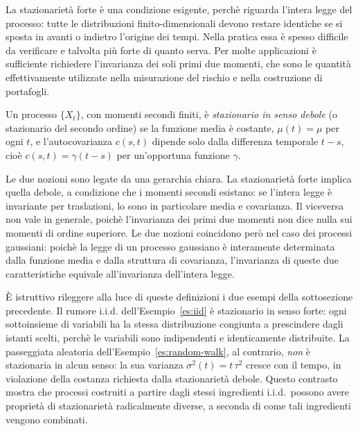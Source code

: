 La stazionariet\`{a} forte \`{e} una condizione esigente, perch\`{e}
riguarda l'intera legge del processo: tutte le distribuzioni
finito-dimensionali devono restare identiche se si sposta in avanti
o indietro l'origine dei tempi. Nella pratica essa \`{e} spesso
difficile da verificare e talvolta pi\`{u} forte di quanto serva. Per
molte applicazioni \`{e} sufficiente richiedere l'invarianza dei soli
primi due momenti, che sono le quantit\`{a} effettivamente utilizzate
nella misurazione del rischio e nella costruzione di portafogli.

\begin{definition}
\label{def:stazionario-debole}
Un processo $\{X_t\}$, con momenti secondi finiti, \`{e}
\emph{stazionario in senso debole} (o stazionario del secondo ordine)
se la funzione media \`{e} costante, $\mu(t)=\mu$ per ogni $t$, e
l'autocovarianza $c(s,t)$ dipende solo dalla differenza temporale
$t-s$, cio\`{e} $c(s,t)=\gamma(t-s)$ per un'opportuna funzione
$\gamma$.
\end{definition}

Le due nozioni sono legate da una gerarchia chiara. La stazionariet\`{a}
forte implica quella debole, a condizione che i momenti secondi
esistano: se l'intera legge \`{e} invariante per traslazioni, lo sono
in particolare media e covarianza. Il viceversa non vale in generale,
poich\`{e} l'invarianza dei primi due momenti non dice nulla sui
momenti di ordine superiore. Le due nozioni coincidono per\`{o} nel
caso dei processi gaussiani: poich\`{e} la legge di un processo
gaussiano \`{e} interamente determinata dalla funzione media e dalla
struttura di covarianza, l'invarianza di queste due caratteristiche
equivale all'invarianza dell'intera legge.

\`{E} istruttivo rileggere alla luce di queste definizioni i due
esempi della sottosezione precedente. Il rumore i.i.d.
dell'Esempio~\ref{es:iid} \`{e} stazionario in senso forte: ogni
sottoinsieme di variabili ha la stessa distribuzione congiunta a
prescindere dagli istanti scelti, perch\`{e} le variabili sono
indipendenti e identicamente distribuite. La passeggiata aleatoria
dell'Esempio~\ref{es:random-walk}, al contrario, \emph{non} \`{e}
stazionaria in alcun senso: la sua varianza $\sigma^2(t)=t\,\tau^2$
cresce con il tempo, in violazione della costanza richiesta dalla
stazionariet\`{a} debole. Questo contrasto mostra che processi
costruiti a partire dagli stessi ingredienti i.i.d.\ possono avere
propriet\`{a} di stazionariet\`{a} radicalmente diverse, a seconda di
come tali ingredienti vengono combinati.

